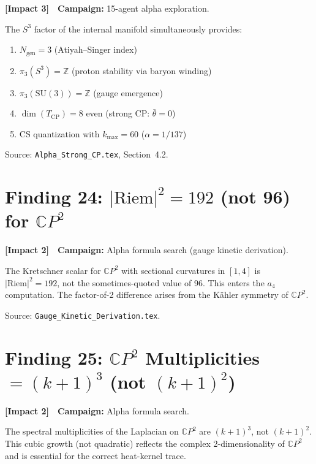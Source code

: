 \documentclass[11pt,a4paper]{article}
\newcommand{\impactthree}{\textcolor{impact3}{\textbf{[Impact 3]}}}
\newcommand{\impacttwo}{\textcolor{impact2}{\textbf{[Impact 2]}}}
\newcommand{\CP}{\mathbb{C}P}
\begin{document}
\impactthree\ \ \textbf{Campaign:} 15-agent alpha exploration.

The $S^3$ factor of the internal manifold simultaneously provides:
\begin{enumerate}[nosep]
\item $N_{\mathrm{gen}} = 3$ (Atiyah--Singer index)
\item $\pi_3(S^3) = \mathbb{Z}$ (proton stability via baryon winding)
\item $\pi_3(\mathrm{SU}(3)) = \mathbb{Z}$ (gauge emergence)
\item $\dim(T_{\mathrm{CP}}) = 8$ even (strong CP: $\bar\theta = 0$)
\item CS quantization with $k_{\max} = 60$ ($\alpha = 1/137$)
\end{enumerate}

Source: \texttt{Alpha\_Strong\_CP.tex}, Section~4.2.


\section{Finding 24: $|\mathrm{Riem}|^2 = 192$ (not 96) for $\CP^2$}
\label{sec:riemann}

\impacttwo\ \ \textbf{Campaign:} Alpha formula search (gauge kinetic derivation).

The Kretschner scalar for $\CP^2$ with sectional curvatures in $[1,4]$
is $|\mathrm{Riem}|^2 = 192$, not the sometimes-quoted value of 96.
This enters the $a_4$ computation. The factor-of-2 difference arises
from the K\"ahler symmetry of $\CP^2$.

Source: \texttt{Gauge\_Kinetic\_Derivation.tex}.


\section{Finding 25: $\CP^2$ Multiplicities $= (k+1)^3$ (not $(k+1)^2$)}
\label{sec:multiplicities}

\impacttwo\ \ \textbf{Campaign:} Alpha formula search.

The spectral multiplicities of the Laplacian on $\CP^2$ are $(k+1)^3$,
not $(k+1)^2$. This cubic growth (not quadratic) reflects the complex
2-dimensionality of $\CP^2$ and is essential for the correct heat-kernel
trace.
\end{document}
